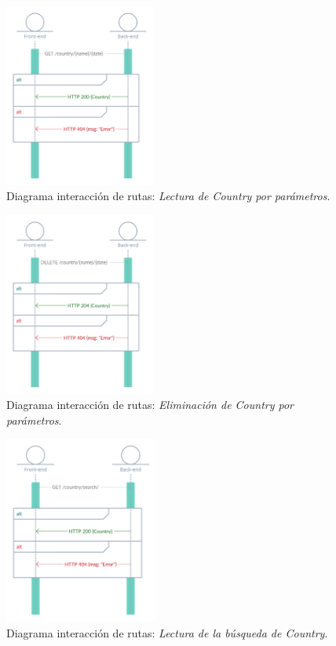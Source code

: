 \begin{figure}[H]
    \centering
    \myfloatalign
    \includegraphics[width=0.44\textwidth]{gfx/diagrama-itr4.png}
    \caption[Diagrama interacción de rutas (4)]{Diagrama interacción de rutas: \textit{Lectura de Country por parámetros}.}\label{gfx:diagrama-itr4}
\end{figure}

\begin{figure}[H]
    \centering
    \myfloatalign
    \includegraphics[width=0.44\textwidth]{gfx/diagrama-itr5.png}
    \caption[Diagrama interacción de rutas (5)]{Diagrama interacción de rutas: \textit{Eliminación de Country por parámetros}.}\label{gfx:diagrama-itr5}
\end{figure}

\begin{figure}[H]
    \centering
    \myfloatalign
    \includegraphics[width=0.45\textwidth]{gfx/diagrama-itr6.png}
    \caption[Diagrama interacción de rutas (6)]{Diagrama interacción de rutas: \textit{Lectura de la búsqueda de Country}.}\label{gfx:diagrama-itr6}
\end{figure}

